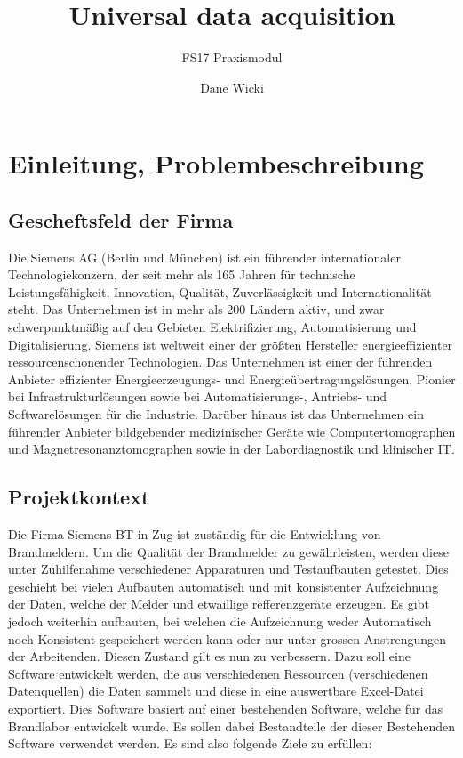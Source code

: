 \documentclass[10pt]{scrartcl}
\author{Dane Wicki}
\title{Universal data acquisition}
\subtitle{FS17 Praxismodul}
\begin{document}
\maketitle
\tableofcontents
\newpage

\section{Einleitung, Problembeschreibung}
\subsection{Gescheftsfeld der Firma}
Die Siemens AG (Berlin und München) ist ein führender internationaler Technologiekonzern, der seit mehr als 165 Jahren für technische Leistungsfähigkeit, Innovation, Qualität, Zuverlässigkeit und Internationalität steht. Das Unternehmen ist in mehr als 200 Ländern aktiv, und zwar schwerpunktmäßig auf den Gebieten Elektrifizierung, Automatisierung und Digitalisierung. Siemens ist weltweit einer der größten Hersteller energieeffizienter ressourcenschonender Technologien. Das Unternehmen ist einer der führenden Anbieter effizienter Energieerzeugungs- und Energieübertragungslösungen, Pionier bei Infrastrukturlösungen sowie bei Automatisierungs-, Antriebs- und Softwarelösungen für die Industrie. Darüber hinaus ist das Unternehmen ein führender Anbieter bildgebender medizinischer Geräte wie Computertomographen und Magnetresonanztomographen sowie in der Labordiagnostik und klinischer IT.
\subsection{Projektkontext}
Die Firma Siemens BT in Zug ist zuständig für die Entwicklung von Brandmeldern.
Um die Qualität der Brandmelder zu gewährleisten, werden diese unter Zuhilfenahme
verschiedener Apparaturen und Testaufbauten getestet. Dies geschieht bei vielen Aufbauten automatisch und mit konsistenter Aufzeichnung der Daten, welche der Melder und etwaillige refferenzgeräte erzeugen. Es gibt jedoch weiterhin aufbauten, bei welchen die Aufzeichnung weder Automatisch noch Konsistent gespeichert werden kann oder nur unter grossen Anstrengungen der Arbeitenden. Diesen Zustand gilt es nun zu verbessern.
Dazu soll eine Software entwickelt werden, die aus verschiedenen Ressourcen (verschiedenen
Datenquellen) die Daten sammelt und diese in eine auswertbare Excel-Datei exportiert. Dies
Software basiert auf einer bestehenden Software, welche für das Brandlabor entwickelt wurde.
Es sollen dabei Bestandteile der dieser Bestehenden Software verwendet werden.
Es sind also folgende Ziele zu erfüllen:
\end{document}
